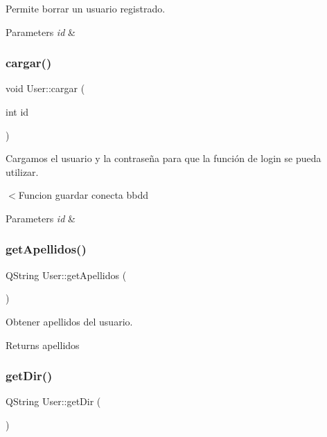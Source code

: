Permite borrar un usuario registrado. 


\begin{DoxyParams}{Parameters}
{\em id} & \\
\hline
\end{DoxyParams}
\mbox{\label{classUser_a3d1f98d7ddb605391b6d2220747c2bd5}} 
\subsubsection{\texorpdfstring{cargar()}{cargar()}}
{\footnotesize\ttfamily void User\+::cargar (\begin{DoxyParamCaption}\item[{int}]{id }\end{DoxyParamCaption})}



Cargamos el usuario y la contraseña para que la función de login se pueda utilizar. 

$<$Funcion guardar conecta bbdd


\begin{DoxyParams}{Parameters}
{\em id} & \\
\hline
\end{DoxyParams}
\mbox{\label{classUser_abe1cf0f201fe92b0d0f4540689477bd4}} 
\subsubsection{\texorpdfstring{get\+Apellidos()}{getApellidos()}}
{\footnotesize\ttfamily Q\+String User\+::get\+Apellidos (\begin{DoxyParamCaption}{ }\end{DoxyParamCaption})}



Obtener apellidos del usuario. 

\begin{DoxyReturn}{Returns}
apellidos 
\end{DoxyReturn}
\mbox{\label{classUser_a1bbfd504de0babb6591de36bc7994673}} 
\subsubsection{\texorpdfstring{get\+Dir()}{getDir()}}
{\footnotesize\ttfamily Q\+String User\+::get\+Dir (\begin{DoxyParamCaption}{ }\end{DoxyParamCaption})}



